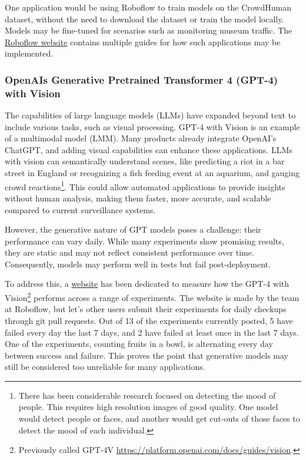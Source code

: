 One application would be using Roboflow to train models on the CrowdHuman dataset, without the need to download the dataset or train the model locally. Models may be fine-tuned for scenarios such as monitoring museum traffic. The \href{https://roboflow.com/}{Roboflow website} contains multiple guides for how such applications may be implemented.

\subsubsection{OpenAIs Generative Pretrained Transformer 4 (GPT-4) with Vision}
The capabilities of large language models (LLMs) have expanded beyond text to include various tasks, such as visual processing. GPT-4 with Vision is an example of a multimodal model (LMM). Many products already integrate OpenAI's ChatGPT, and adding visual capabilities can enhance these applications. LLMs with vision can semantically understand scenes, like predicting a riot in a bar street in England or recognizing a fish feeding event at an aquarium, and gauging crowd reactions\footnote{There has been considerable research focused on detecting the mood of people. This requires high resolution images of good quality. One model would detect people or faces, and another would get cut-outs of those faces to detect the mood of each individual.}. This could allow automated applications to provide insights without human analysis, making them faster, more accurate, and scalable compared to current surveillance systems.

However, the generative nature of GPT models poses a challenge: their performance can vary daily. While many experiments show promising results, they are static and may not reflect consistent performance over time. Consequently, models may perform well in tests but fail post-deployment.

To address this, a \href{https://www.gptcheckup.com/}{website} has been dedicated to measure how the GPT-4 with Vision\footnote{Previously called GPT-4V \href{https://platform.openai.com/docs/guides/vision}{https://platform.openai.com/docs/guides/vision}.} performs across a range of experiments. The website is made by the team at Roboflow, but let's other users submit their experiments for daily checkups through git pull requests. Out of 13 of the experiments currently posted, 5 have failed every day the last 7 days, and 2 have failed at least once in the last 7 days. One of the experiments, counting fruits in a bowl, is alternating every day between success and failure. This proves the point that generative models may still be considered too unreliable for many applications.

